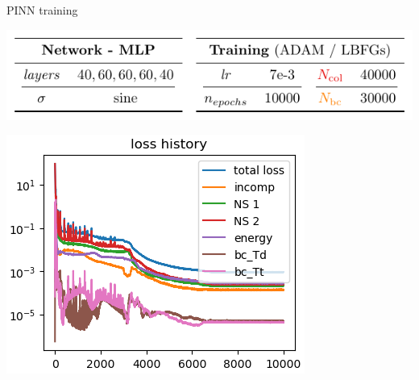 \begin{frame}{PINN training}
    \vspace{-7pt}
    \vspace{3pt}    
    \begin{center}
        \begin{minipage}{0.62\linewidth}
            \centering
            \vspace{-8pt}
            \includegraphics[width=0.94\linewidth]{images/pinn/training_param/training_param.pdf}
        \end{minipage}
        \begin{minipage}{0.36\linewidth}
            \centering
            \includegraphics[width=0.84\linewidth]{images/pinn/training/test4_v5.png}
        \end{minipage}
    \end{center}
    
    \vspace{-8pt}
\end{frame}

